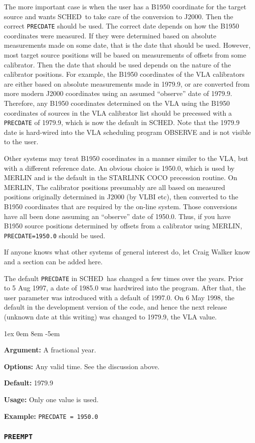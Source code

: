 \documentclass{report}
\newcommand{\sched}{{\sc SCHED}}
\newcommand{\schedb}{{\sc SCHED~}}
\newcommand{\rcwbox}[5]{
  \begin{list}{}{\parsep 1ex  \itemsep 0em
                 \leftmargin 8em  \itemindent -5em }
    \item {\bf Argument:} #1
    \item {\bf Options:}  #2
    \item {\bf Default:}  #3
    \item {\bf Usage:}    #4
    \item {\bf Example:}  #5
  \end{list}
}
\begin{document}
The more important case is when the user has a B1950 coordinate for
the target source and wants \schedb to take care of the conversion to
J2000.  Then the correct {\tt PRECDATE} should be used.  The correct
date depends on how the B1950 coordinates were measured.  If they
were determined based on absolute measurements made on some date,
that is the date that should be used.  However, most target source
positions will be based on measurements of offsets from some
calibrator.  Then the date that should be used depends on the nature
of the calibrator positions.  For example, the B1950 coordinates
of the VLA calibrators are either based on absolute measurements
made in 1979.9, or are converted from more modern J2000 coordinates
using an assumed ``observe'' date of 1979.9.  Therefore, any B1950
coordinates determined on the VLA using the B1950 coordinates of
sources in the VLA calibrator list should be precessed with a
{\tt PRECDATE} of 1979.9, which is now the default in \sched.  Note
that the 1979.9 date is hard-wired into the VLA scheduling program
{\sc OBSERVE} and is not visible to the user.

Other systems may treat B1950 coordinates in a manner similer to the
VLA, but with a different reference date.  An obvious choice is
1950.0, which is used by MERLIN and is the default in the STARLINK
COCO precession routine.  On MERLIN, The calibrator positions
presumably are all based on measured positions originally determined
in J2000 (by VLBI etc), then converted to the B1950 coordinates that
are required by the on-line system.  Those conversions have all been
done assuming an ``observe'' date of 1950.0.  Thus, if you have B1950
source positions determined by offsets from a calibrator using MERLIN,
{\tt PRECDATE=1950.0} should be used.

If anyone knows what other systems of general interest do, let
Craig Walker know and a section can be added here.

The default {\tt PRECDATE} in \schedb has changed a few times over the
years.  Prior to 5 Aug 1997, a date of 1985.0 was hardwired into
the program.  After that, the user parameter was introduced with a
default of 1997.0.  On 6 May 1998, the default in the development
version of the code, and hence the next release (unknown date at this
writing) was changed to 1979.9, the VLA value.

\rcwbox
{A fractional year.}
{Any valid time.  See the discussion above.}
{1979.9}
{Only one value is used.}
{{\tt PRECDATE = 1950.0}}

\subsubsection{\label{MP:PREEMPT}{\tt PREEMPT}}
\end{document}

